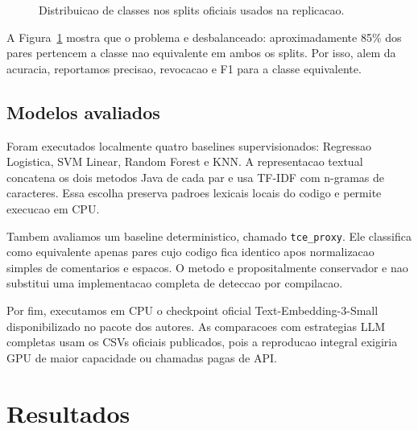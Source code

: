 \documentclass[sigconf,screen,nonacm]{acmart}
\begin{document}
\begin{figure}[t]
  \centering
  \caption{Distribuicao de classes nos splits oficiais usados na replicacao.}
  \label{fig:classes}
\end{figure}

A Figura~\ref{fig:classes} mostra que o problema e desbalanceado: aproximadamente 85\% dos pares pertencem a classe nao equivalente em ambos os splits. Por isso, alem da acuracia, reportamos precisao, revocacao e F1 para a classe equivalente.

\subsection{Modelos avaliados}

Foram executados localmente quatro baselines supervisionados: Regressao Logistica, SVM Linear, Random Forest e KNN. A representacao textual concatena os dois metodos Java de cada par e usa TF-IDF com n-gramas de caracteres. Essa escolha preserva padroes lexicais locais do codigo e permite execucao em CPU.

Tambem avaliamos um baseline deterministico, chamado \texttt{tce\_proxy}. Ele classifica como equivalente apenas pares cujo codigo fica identico apos normalizacao simples de comentarios e espacos. O metodo e propositalmente conservador e nao substitui uma implementacao completa de deteccao por compilacao.

Por fim, executamos em CPU o checkpoint oficial Text-Embedding-3-Small disponibilizado no pacote dos autores. As comparacoes com estrategias LLM completas usam os CSVs oficiais publicados, pois a reproducao integral exigiria GPU de maior capacidade ou chamadas pagas de API.

\section{Resultados}
\end{document}
